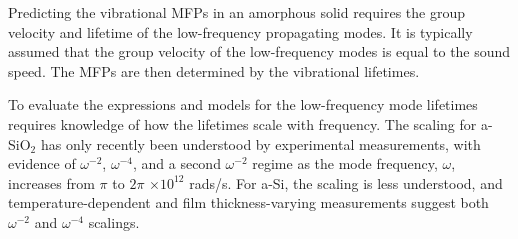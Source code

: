 \documentclass[aps,prb,onecolumn,preprint,superscriptaddress,footinbib,amsmath,amssymb,floatfix]{revtex4}
\begin{document}
Predicting the vibrational MFPs in an amorphous solid 
requires the group velocity and lifetime 
of the low-frequency propagating modes.
\cite{freeman_thermal_1986,graebner_phonon_1986,
love_estimate_1990,feldman_thermal_1993,cahill_thermal_1994,
feldman_numerical_1999,baldi_thermal_2008,liu_high_2009,
yang_anomalously_2010} It is typically assumed that 
the group velocity of the low-frequency modes 
is equal to the sound speed.\cite{zeller_thermal_1971,
freeman_thermal_1986,graebner_phonon_1986,cahill_lattice_1988,
cahill_heat_1989,love_estimate_1990,feldman_thermal_1993,
cahill_thermal_1994,feldman_numerical_1999} The MFPs 
are then determined by the vibrational lifetimes. 

To 
evaluate the expressions and models for the low-frequency 
mode lifetimes requires knowledge of how the lifetimes 
scale with frequency.
\cite{freeman_thermal_1986,graebner_phonon_1986,
love_estimate_1990,feldman_thermal_1993,cahill_thermal_1994,
feldman_numerical_1999,zink_thermal_2006,baldi_thermal_2008,
liu_high_2009,yang_anomalously_2010,hondongwa_ultrasonic_2011} 
The scaling for a-SiO$_2$ has only recently been understood by experimental 
measurements, with evidence of $\omega^{-2}$, $\omega^{-4}$, and a 
second $\omega^{-2}$ regime as the mode frequency, $\omega$, 
increases from $\pi$ to $2\pi$ $\times 10^{12}$ rads/s.
\cite{masciovecchio_evidence_2006,
baldi_sound_2010,baldi_elastic_2011,baldi_emergence_2013} 
For a-Si, the scaling is less understood,
\cite{feldman_thermal_1993,cahill_thermal_1994,
feldman_numerical_1999,zink_thermal_2006,liu_high_2009,
yang_anomalously_2010,he_heat_2011,hondongwa_ultrasonic_2011} 
and temperature-dependent\cite{pompe_thermal_1988,zink_thermal_2006,
liu_high_2009} and film thickness-varying measurements
\cite{hasselman_thermal_1989,kuo_thermal_1992,cahill_thermal_1994,
wada_thermal_1996,moon_thermal_2002,zink_thermal_2006,zink_excess_2006,
liu_high_2009,yang_anomalously_2010}
suggest both $\omega^{-2}$ and $\omega^{-4}$ scalings.
\cite{feldman_thermal_1993,feldman_numerical_1999}  
\end{document}
